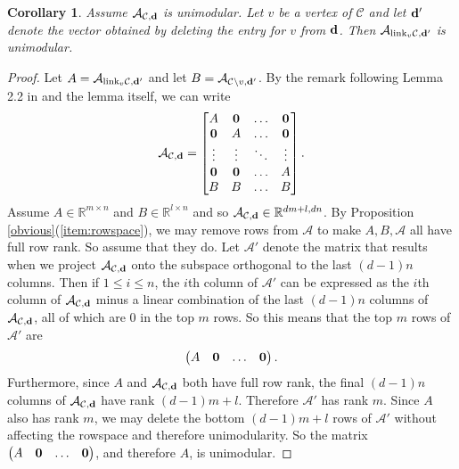 \documentclass[letterpaper,12pt]{amsart}
\theoremstyle{plain}
\newtheorem{cor}[thm]{Corollary}
\theoremstyle{definition}
\theoremstyle{remark}
\newcommand{\rr}{\mathbb{R}}
\newcommand{\link}{\textnormal{link}}
\begin{document}
\begin{cor}\label{linknonbinary}
	Assume $\mathcal{A}_{\mathcal{C},{\bf d}}$ is unimodular.
	Let $v$ be a vertex of $\mathcal{C}$ and let ${\bf d}'$ denote the vector obtained by deleting the entry for $v$ from ${\bf d}$.
	Then $\mathcal{A}_{\link_v{\mathcal{C}},{\bf d}'}$ is unimodular.
\end{cor}
\begin{proof}
	Let $A = \mathcal{A}_{\link_v{\mathcal{C}},{\bf d}'}$ and let $B = \mathcal{A}_{\mathcal{C}\setminus v, {\bf d}'}$.
	By the remark following Lemma 2.2 in \cite{HostenSullivant2007} and the lemma itself, we can write
	\[
		\mathcal{A}_{\mathcal{C},{\bf d}} =\left[\begin{matrix}
						A &  {\bf 0}  & \ldots & {\bf 0}\\
						{\bf 0}  &  A & \ldots & {\bf 0}\\
						\vdots & \vdots & \ddots & \vdots\\
						{\bf 0}  &   {\bf 0}       &\ldots & A\\
						B & B & \dots & B
					\end{matrix}\right].
	\]
	Assume $A \in \rr^{m \times n}$ and $B \in \rr^{l \times n}$ and so $\mathcal{A}_{\mathcal{C},{\bf d}} \in \rr^{dm+l, dn}$.
	{ By Proposition \ref{obvious}(\ref{item:rowspace}),
	we may remove rows from $\mathcal{A}$ to make $A,B,\mathcal{A}$ all have full row rank.
	So assume that they do.}
	Let $\mathcal{A}'$ denote the matrix that results when we project $\mathcal{A}_{\mathcal{C},{\bf d}}$
	onto the subspace orthogonal to the last $(d-1)n$ columns.
	Then if $1 \le i \le n$, the $i$th column of $\mathcal{A}'$ can be expressed as the $i$th column of $\mathcal{A}_{\mathcal{C},{\bf d}}$
	minus a linear combination of the last $(d-1)n$ columns of $\mathcal{A}_{\mathcal{C},{\bf d}}$,
	all of which are $0$ in the top $m$ rows.
	So this means that the top $m$ rows of $\mathcal{A}'$ are
	\[
		\begin{pmatrix} A & {\bf 0} & \dots & {\bf 0} \end{pmatrix}.
	\]
	Furthermore, since $A$ and $\mathcal{A}_{\mathcal{C},{\bf d}}$ both have full row rank,
	the final $(d-1)n$ columns of $\mathcal{A}_{\mathcal{C},{\bf d}}$ have rank $(d-1)m+l$.
	Therefore $\mathcal{A}'$ has rank $m$.
	Since $A$ also has rank $m$, we may delete the bottom $(d-1)m+l$ rows of $\mathcal{A}'$ without affecting the rowspace
	and therefore unimodularity.
	So the matrix $\begin{pmatrix} A & {\bf 0} & \dots & {\bf 0} \end{pmatrix}$, and therefore $A$, is unimodular.
\end{proof}
\end{document}
